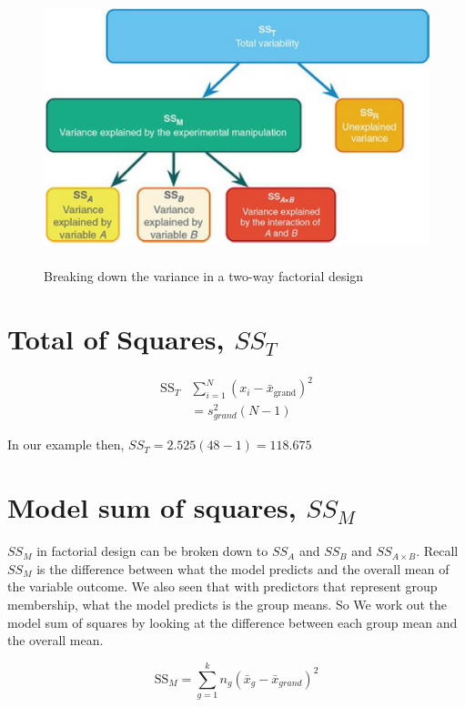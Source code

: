 \begin{figure}[ht]
	\includegraphics[width=1\textwidth,height=80mm]{Chapter 14 GLM 3 Factorial Designs/SSsubdivision.PNG}
	\caption{Breaking down the variance in a two-way factorial design}
\end{figure}

\section{Total of Squares, $SS_T$}

\begin{equation}
\begin{split}
\text{SS}_T & \sum^N_{i=1}(x_i - \bar{x}_{\text{grand}})^2\\
&= s^2_{grand}(N-1) 
\end{split}
\end{equation}

In our example then, $SS_T = 2.525(48 - 1) = 118.675$

\section{Model sum of squares, $SS_M$}
$SS_M$ in factorial design can be broken down to $SS_A$ and $SS_B$ and $SS_{A \times B}$. 
Recall $SS_M$ is the difference between what the model predicts and the overall mean of the variable outcome. We also seen that with predictors that represent group membership, what the model predicts is the group means. So We work out the model sum of squares by looking at the difference between each group mean and the overall mean. 

\begin{equation}
\text{SS}_M = \sum^k_{g=1} n_g(\bar{x}_g - \bar{x}_{grand})^2
\end{equation}

